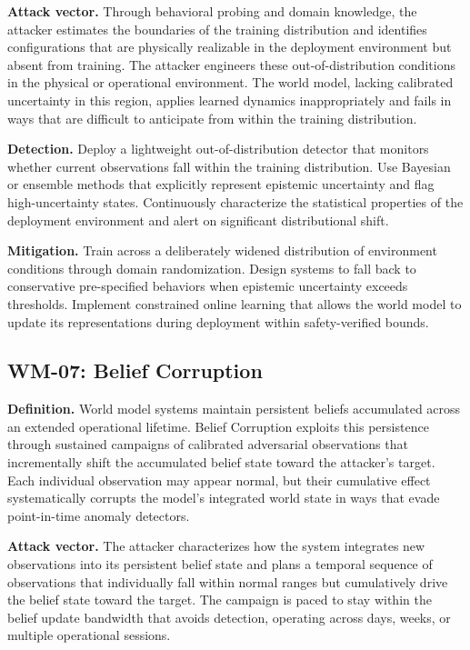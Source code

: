 \documentclass[11pt,a4paper]{article}
\begin{document}
\textbf{Attack vector.} Through behavioral probing and domain knowledge, the attacker estimates the boundaries of the training distribution and identifies configurations that are physically realizable in the deployment environment but absent from training. The attacker engineers these out-of-distribution conditions in the physical or operational environment. The world model, lacking calibrated uncertainty in this region, applies learned dynamics inappropriately and fails in ways that are difficult to anticipate from within the training distribution.

\textbf{Detection.} Deploy a lightweight out-of-distribution detector that monitors whether current observations fall within the training distribution. Use Bayesian or ensemble methods that explicitly represent epistemic uncertainty and flag high-uncertainty states. Continuously characterize the statistical properties of the deployment environment and alert on significant distributional shift.

\textbf{Mitigation.} Train across a deliberately widened distribution of environment conditions through domain randomization. Design systems to fall back to conservative pre-specified behaviors when epistemic uncertainty exceeds thresholds. Implement constrained online learning that allows the world model to update its representations during deployment within safety-verified bounds.

\subsection{WM-07: Belief Corruption}

\textbf{Definition.} World model systems maintain persistent beliefs accumulated across an extended operational lifetime. Belief Corruption exploits this persistence through sustained campaigns of calibrated adversarial observations that incrementally shift the accumulated belief state toward the attacker's target. Each individual observation may appear normal, but their cumulative effect systematically corrupts the model's integrated world state in ways that evade point-in-time anomaly detectors.

\textbf{Attack vector.} The attacker characterizes how the system integrates new observations into its persistent belief state and plans a temporal sequence of observations that individually fall within normal ranges but cumulatively drive the belief state toward the target. The campaign is paced to stay within the belief update bandwidth that avoids detection, operating across days, weeks, or multiple operational sessions.
\end{document}
